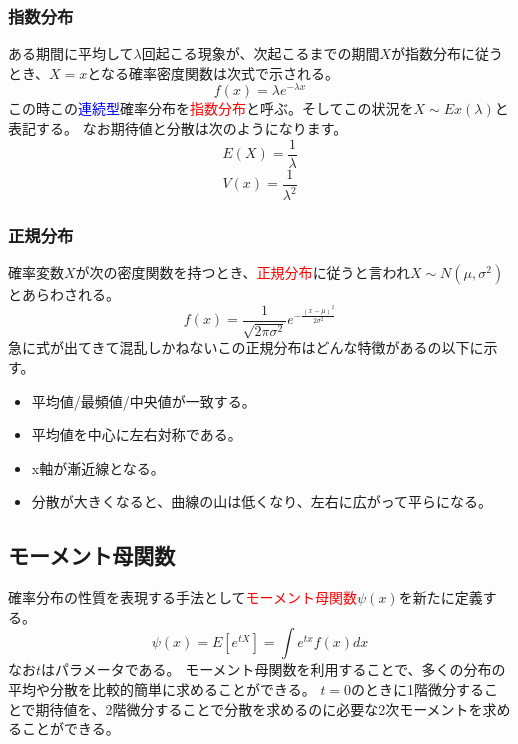 \documentclass[a4paper,10pt]{jarticle}
\begin{document}
\subsubsection{指数分布}
ある期間に平均して$\lambda$回起こる現象が、次起こるまでの期間$X$が指数分布に従うとき、$X=x$となる確率密度関数は次式で示される。
\begin{equation}
    f(x) = \lambda e^{-\lambda x}\tag{3,10}
\end{equation}
この時この\textcolor{blue}{連続型}確率分布を\textcolor{red}{指数分布}と呼ぶ。そしてこの状況を$X\sim Ex(\lambda)$と表記する。
なお期待値と分散は次のようになります。
\begin{equation}
    E(X)=\frac{1}{\lambda}\tag{3,11}
\end{equation}
\begin{equation}
    V(x)=\frac{1}{\lambda^2}\tag{3,12}
\end{equation}
\subsubsection{正規分布}
確率変数$X$が次の密度関数を持つとき、\textcolor{red}{正規分布}に従うと言われ$X\sim N(\mu,\sigma^2)$とあらわされる。
\begin{equation}
    f(x) = \frac{1}{\sqrt{2\pi\sigma^2}}e^{-\frac{(x-\mu)^2}{2\sigma^2}}\tag{3,13}
\end{equation}
急に式が出てきて混乱しかねないこの正規分布はどんな特徴があるの以下に示す。
\begin{itemize}
    \item 平均値/最頻値/中央値が一致する。
    \item 平均値を中心に左右対称である。
    \item x軸が漸近線となる。
    \item 分散が大きくなると、曲線の山は低くなり、左右に広がって平らになる。
\end{itemize}
\subsection{モーメント母関数}
確率分布の性質を表現する手法として\textcolor{red}{モーメント母関数}$\psi(x)$を新たに定義する。
\begin{equation}
    \psi(x) = E[e^{tX}] = \int e^{tx}f(x)dx\tag{3,15}
\end{equation}
なお$t$はパラメータである。
モーメント母関数を利用することで、多くの分布の平均や分散を比較的簡単に求めることができる。
$t=0$のときに1階微分することで期待値を、2階微分することで分散を求めるのに必要な2次モーメントを求めることができる。
\end{document}

